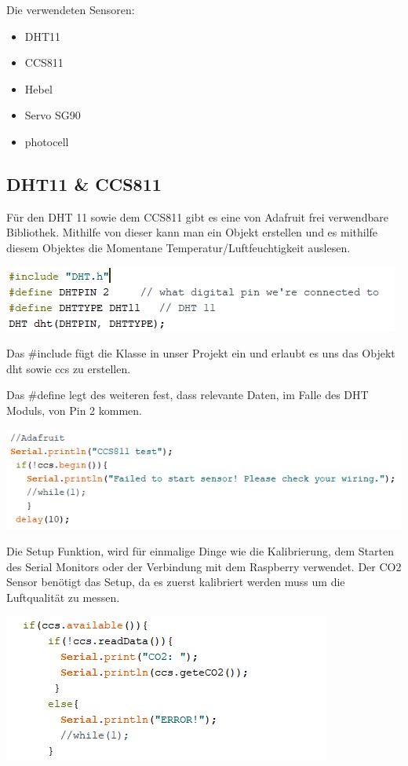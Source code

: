 Die verwendeten Sensoren:

\begin{itemize}
	\item DHT11
	\item CCS811
	\item Hebel
	\item Servo SG90
	\item photocell
\end{itemize}


\subsection{DHT11 \& CCS811}

Für den DHT 11 sowie dem CCS811 gibt es eine von Adafruit frei verwendbare Bibliothek. Mithilfe von dieser kann man ein Objekt erstellen und es mithilfe diesem Objektes die Momentane Temperatur/Luftfeuchtigkeit auslesen.


	\includegraphics[width=1\linewidth]{../Bilder/Programmierung/define(DHTCCS)}



Das \#include fügt die Klasse in unser Projekt ein und erlaubt es uns das Objekt dht sowie ccs zu erstellen.

Das \#define legt des weiteren fest, dass relevante Daten, im Falle des DHT Moduls, von Pin 2 kommen. 


	\includegraphics[width=1.2\linewidth]{../Bilder/Programmierung/setup(CCS)}



Die Setup Funktion, wird für einmalige Dinge wie die Kalibrierung, dem Starten des Serial Monitors oder der Verbindung mit dem Raspberry verwendet. Der CO2 Sensor benötigt das Setup, da es zuerst kalibriert werden muss um die Luftqualität zu messen.

	\includegraphics[width=0.9\linewidth]{../Bilder/Programmierung/loop(DHTCCS)}



